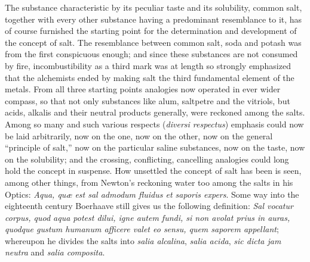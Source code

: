 \documentclass[12pt,a4paper]{book}
\begin{document}
The substance characteristic by its peculiar taste and its solubility, common
salt, together with every other substance having a predominant resemblance to
it, has of course furnished the starting point for the determination and
development of the concept of salt. The resemblance between common salt, soda
and potash was from the first conspicuous enough; and since these substances
are not consumed by fire, incombustibility as a third mark was at length so
strongly emphasized that the alchemists ended by making salt the third
fundamental element of the metals. From all three starting points analogies now
operated in ever wider compass, so that not only substances like alum,
saltpetre and the vitriols, but acids, alkalis and their neutral products
generally, were reckoned among the salts. Among so many and such various
respects
(\textit{diversi respectus}) emphasis could now be laid arbitrarily, now on the
one, now on the other, now on the general ``principle of salt,'' now on the
particular saline substances, now on the taste, now on the solubility; and the
crossing, conflicting, cancelling analogies could long hold the concept in
suspense. How unsettled the concept of salt has been is seen, among other
things, from Newton's reckoning water too among the salts in his Optics:
\textit{Aqua, quæ est sal admodum fluidus et saporis expers}. Some way into the
eighteenth century Boerhaave still gives us the following definition:
\textit{Sal vocatur corpus, quod aqua potest dilui, igne autem fundi, si non
avolat prius in auras, quodque gustum humanum afficere valet eo sensu, quem
saporem appellant}; whereupon he divides the salts into \textit{salia
alcalina}, \textit{salia acida}, \textit{sic dicta jam neutra} and
\textit{salia composita}.
\end{document}
